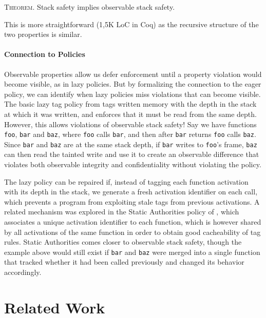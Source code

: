 \documentclass[acmsmall,review,anonymous]{acmart}\settopmatter{printfolios=true,printccs=false,printacmref=false}
\begin{document}
{{      \medskip
      \textsc{Theorem.}
      Stack safety implies observable stack safety.
      \smallskip

      This is more straightforward  (1,5K LoC in Coq) as the recursive
      structure of the two properties is similar.

    \paragraph{Connection to Policies}

    Observable properties allow us defer enforcement until a property
    violation would become visible, as in lazy policies. But by formalizing
    the connection to the eager policy, we can identify when lazy policies
    miss violations that can become visible. The basic lazy tag policy from
    \citet{DBLP:conf/sp/RoesslerD18} tags written memory with the depth in the
    stack at which it was written, and enforces that it must be read from the
    same depth. However, this allows violations of observable stack safety!
    Say we have functions {\tt foo}, {\tt bar} and {\tt baz}, where {\tt foo}
    calls {\tt bar}, and then after {\tt bar} returns {\tt foo} calls
    {\tt baz}. Since {\tt bar} and {\tt baz} are at the same stack depth, if
    {\tt bar} writes to {\tt foo}'s frame, {\tt baz} can then read the tainted
    write and use it to create an observable difference that violates both
    observable integrity and confidentiality without violating the policy.

    The lazy policy can be repaired if, instead of tagging each function
    activation with its depth in the stack, we generate a fresh activation
    identifier on each call, which prevents a program from exploiting stale
    tags from previous activations. A related mechanism was explored in the
    Static Authorities policy of \citet{DBLP:conf/sp/RoesslerD18}, which
    associates a unique activation identifier to each function, which is
    however shared by all activations of the same function in order to obtain
    good cacheability of tag rules. Static Authorities comes closer to
    observable stack safety, though the example above would still exist
    if {\tt bar} and {\tt baz} were merged into a single function that tracked
    whether it had been called previously and changed its behavior accordingly.


\section{Related Work}
\label{sec:relwork}

}}
\end{document}
